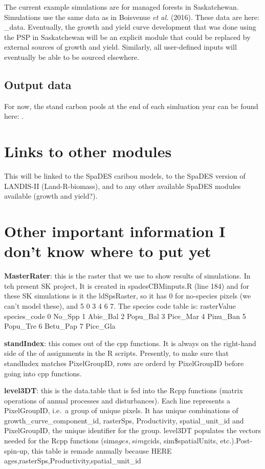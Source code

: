 \documentclass[]{article}
\begin{document}
The current example simulations are for managed forests in Saskatchewan.
Simulations use the same data as in Boisvenue \emph{et al.} (2016).
These data are here: \spadesCBM\data\forIan\SK\_data. Eventually, the
growth and yield curve development that was done using the PSP in
Saskatchewan will be an explicit module that could be replaced by
external sources of growth and yield. Similarly, all user-defined inputs
will eventually be able to be sourced elsewhere.

\subsection{Output data}\label{output-data}

For now, the stand carbon pools at the end of each simluation year can
be found here: \spadesCBM\outputs.

\section{Links to other modules}\label{links-to-other-modules}

This will be linked to the SpaDES caribou models, to the SpaDES version
of LANDIS-II (Land-R-biomass), and to any other available SpaDES modules
available (growth and yield?).

\section{Other important information I don't know where to put
yet}\label{other-important-information-i-dont-know-where-to-put-yet}

\textbf{MasterRater}: this is the raster that we use to show results of
simulations. In teh present SK project, It is created in
spadesCBMinputs.R (line 184) and for these SK simulations is it the
ldSpsRaster, so it has 0 for no-species pixels (we can't model these),
and 5 0 3 4 6 7. The species code table is: rasterValue species\_code 0
No\_Spp 1 Abie\_Bal 2 Popu\_Bal 3 Pice\_Mar 4 Pinu\_Ban 5 Popu\_Tre 6
Betu\_Pap 7 Pice\_Gla

\textbf{standIndex}: this comes out of the cpp functions. It is always
on the right-hand side of the of assignments in the R scripts.
Presently, to make sure that standIndex matches PixelGroupID, rows are
orderd by PixelGroupID before going into cpp functions.

\textbf{level3DT}: this is the data.table that is fed into the Rcpp
functions (matrix operations of annual processes and disturbances). Each
line represents a PixelGroupID, i.e.~a group of unique pixels. It has
unique combinations of growth\_curve\_component\_id, rasterSps,
Productivity, spatial\_unit\_id and PixelGroupID, the unique identifier
for the group. level3DT populates the vectors needed for the Rcpp
functions (sim\(ages, sim\)gcids, sim\$spatialUnits, etc.).Post-spin-up,
this table is remade annually because HERE
ages,rasterSps,Productivity,spatial\_unit\_id
\end{document}
